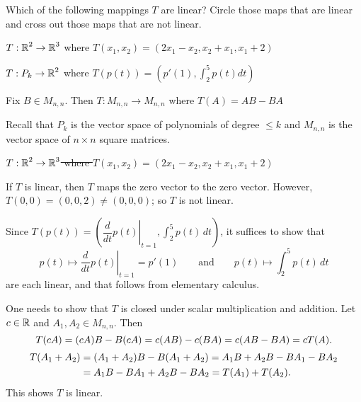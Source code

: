 \documentclass{ximera}
\author{Matthew Carr}
\begin{document}
\begin{exercise}\label{mc.exercise3}


Which of the following mappings $T$ are linear?  Circle those maps that are linear and cross out those maps that are not linear.

\begin{enumeratea}
\item $T:\mbox{$\mathbb{R}$}^2\to\mbox{$\mathbb{R}$}^3$ where $T(x_1,x_2) = (2x_1 - x_2, x_2 + x_1, x_1 + 2)$
\item $T:P_k\to\mbox{$\mathbb{R}$}^2$ where $T(p(t)) = (p'(1), \int_2^5p(t)dt)$
\item Fix $B\in M_{n,n}$. Then $T:M_{n,n}\to M_{n,n}$ where $T(A) = AB-BA$
\end{enumeratea}
Recall that $P_k$ is the vector space of polynomials of degree $\leq k$ and $M_{n,n}$ is the vector space of $n\times n$ square matrices. 
 
  
\begin{solution}

\ans \begin{enumeratea}
\item \sout{$T:\mbox{$\mathbb{R}$}^2\to\mbox{$\mathbb{R}$}^3$ where $T(x_1,x_2) = (2x_1 - x_2, x_2 + x_1, x_1 + 2)$}
\item {}
\item {}
\end{enumeratea}


\soln  
\begin{enumeratea}
\item If $T$ is linear, then $T$ maps the zero vector to the zero vector.  However, $T(0,0)=(0,0,2)\ne (0,0,0)$; so $T$ is not linear.
\item Since $T(p(t))=\left(\left.\dfrac{d}{dt}p(t)\right|_{t=1},\int_{2}^{5}p(t)\,dt\right)$, it suffices to show that 
\[
p(t)\mapsto \left.\dfrac{d}{dt}p(t)\right|_{t=1}=p'(1)\qquad\text{and}\qquad p(t)\mapsto \int_{2}^{5}p(t)\,dt
\]
are each linear, and that follows from elementary calculus. 
\item One needs to show that $T$ is closed under scalar multiplication and addition.  Let $c\in\mbox{$\mathbb{R}$}$ and $A_1,A_2\in M_{n,n}$. Then 
\[
T(cA)=(cA)B-B(cA)=c(AB)-c(BA)=c(AB-BA) = cT(A)\ldotp
\] 
\begin{align*}
T(A_1+A_2)&=(A_1+A_2)B-B(A_1+A_2)=A_1 B+A_2 B-B A_1-BA_2\\
&=A_1 B-BA_1+A_2B-BA_2=T(A_1)+T(A_2)\ldotp
\end{align*}
This shows $T$ is linear.
\end{enumeratea}

\end{solution}
\end{exercise}
\end{document}
